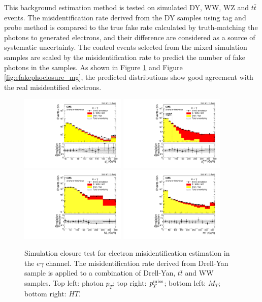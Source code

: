 \documentclass[thesis.tex]{subfiles}
\renewcommand\_{\textunderscore\allowbreak}
\begin{document}
   This background estimation method is tested on simulated DY, WW, WZ and $t\bar{t}$ events. The misidentification rate derived from the DY samples using tag and probe method is compared to the true fake rate calculated by truth-matching the photons to generated electrons, and their difference are considered as a source of systematic uncertainty. The control events selected from the mixed simulation samples are scaled by the misidentification rate to predict the number of fake photons in the samples. As shown in Figure \ref{fig:efakephoclosure_egamma} and Figure \ref{fig:efakephoclosure_mg}, the predicted distributions show good agreement with the real misidentified electrons.  

\begin{figure}[hbtp]
  \centering
    \includegraphics[width=0.45\textwidth]{Fig/closure_elefakepho_PhotonEt_eg.pdf}
    \includegraphics[width=0.45\textwidth]{Fig/closure_elefakepho_MET_eg.pdf}
    \includegraphics[width=0.45\textwidth]{Fig/closure_elefakepho_MT_eg.pdf}
    \includegraphics[width=0.45\textwidth]{Fig/closure_elefakepho_HT_eg.pdf}
  \caption{Simulation closure test for electron misidentification estimation in the $e\gamma$ channel. The misidentification rate derived from Drell-Yan sample is applied to a combination of Drell-Yan, $t\bar{t}$ and WW samples. Top left: photon $p_T$; top right: $p_T^\textrm{miss}$; bottom left: $M_T$; bottom right: $HT$.}
  \label{fig:efakephoclosure_egamma}
\end{figure}
\end{document}
